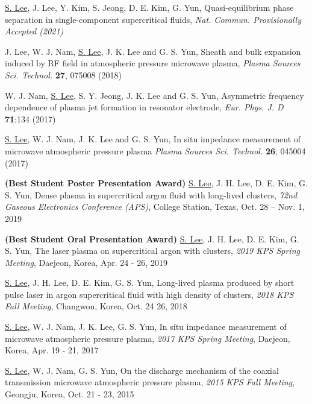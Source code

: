 \begin{publication}
    \item \underline{S. Lee}, J. Lee, Y. Kim, S. Jeong, D. E. Kim, G. Yun, Quasi-equilibrium phase separation in single-component supercritical fluids, \textit{Nat. Commun. Provisionally Accepted (2021)}
    \item J. Lee, W. J. Nam, \underline{S. Lee}, J. K. Lee and G. S. Yun, Sheath and bulk expansion induced by RF field in atmospheric pressure microwave plasma, \textit{Plasma Sources Sci. Technol.} \textbf{27}, 075008 (2018)
    \item W. J. Nam, \underline{S. Lee}, S. Y. Jeong, J. K. Lee and G. S. Yun, Asymmetric frequency dependence of plasma jet formation in resonator electrode, \textit{Eur. Phys. J. D} \textbf{71}:134 (2017)
    \item \underline{S. Lee}, W. J. Nam, J. K. Lee and G. S. Yun, In situ impedance measurement of microwave atmospheric pressure plasma \textit{Plasma Sources Sci. Technol.} \textbf{26}, 045004 (2017)
\end{publication}

\begin{conference}
    \item \textbf{(Best Student Poster Presentation Award)} \underline{S. Lee}, J. H. Lee, D. E. Kim, G. S. Yun, Dense plasma in supercritical argon fluid with long-lived clusters, \textit{72nd Gaseous Electronics Conference (APS)}, College Station, Texas, Oct. 28 – Nov. 1, 2019
    \item \textbf{(Best Student Oral Presentation Award)} \underline{S. Lee}, J. H. Lee, D. E. Kim, G. S. Yun, The laser plasma on supercritical argon with clusters, \textit{2019 KPS Spring Meeting}, Daejeon, Korea, Apr. 24 - 26, 2019
    \item \underline{S. Lee}, J. H. Lee, D. E. Kim, G. S. Yun, Long-lived plasma produced by short pulse laser in argon supercritical fluid with high density of clusters, \textit{2018 KPS Fall Meeting}, Changwon, Korea, Oct. 24 26, 2018
    \item \underline{S. Lee}, W. J. Nam, J. K. Lee, G. S. Yun, In situ impedance measurement of microwave atmospheric pressure plasma, \textit{2017 KPS Spring Meeting}, Daejeon, Korea, Apr. 19 - 21, 2017
    \item \underline{S. Lee}, W. J. Nam, G. S. Yun, On the discharge mechanism of the coaxial transmission microwave atmospheric pressure plasma, \textit{2015 KPS Fall Meeting}, Geongju, Korea, Oct. 21 - 23, 2015
\end{conference}
